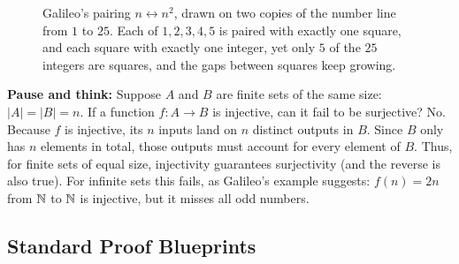 \begin{figure}[htbp]
\centering
{}
\caption{Galileo's pairing $n \leftrightarrow n^2$, drawn on two copies of the number line from $1$ to $25$. Each of $1, 2, 3, 4, 5$ is paired with exactly one square, and each square with exactly one integer, yet only $5$ of the $25$ integers are squares, and the gaps between squares keep growing.}
\label{13:fig-galileo}
\end{figure}

\begin{recoverybox}
\textbf{Pause and think:} Suppose $A$ and $B$ are finite sets of the same size: $|A| = |B| = n$. If a function $f: A \to B$ is injective, can it fail to be surjective?
No. Because $f$ is injective, its $n$ inputs land on $n$ distinct outputs in $B$. Since $B$ only has $n$ elements in total, those outputs must account for every element of $B$. Thus, for finite sets of equal size, injectivity guarantees surjectivity (and the reverse is also true). For infinite sets this fails, as Galileo's example suggests: $f(n) = 2n$ from $\mathbb{N}$ to $\mathbb{N}$ is injective, but it misses all odd numbers.
\end{recoverybox}

\subsection{Standard Proof Blueprints}

